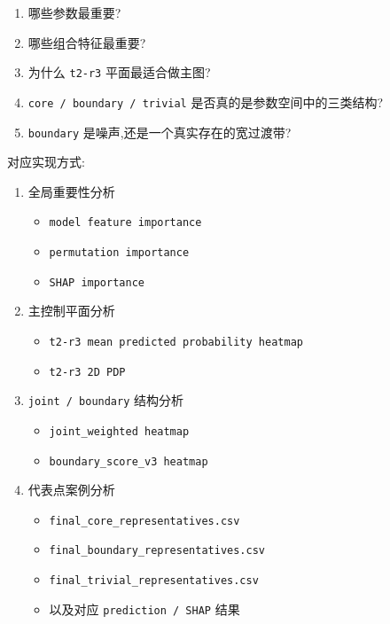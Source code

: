 \documentclass[lang=cn,scheme=chinese,color=blue,device=normal,toc=onecol,math=cm]{elegantbook}
\begin{document}
\begin{enumerate}
\item 哪些参数最重要?
\item 哪些组合特征最重要?
\item 为什么 \texttt{t2-r3} 平面最适合做主图?
\item \texttt{core /\allowbreak{} boundary /\allowbreak{} trivial} 是否真的是参数空间中的三类结构?
\item \texttt{boundary} 是噪声,还是一个真实存在的宽过渡带?
\end{enumerate}


对应实现方式:\par


\begin{enumerate}
\item 全局重要性分析 
\begin{itemize}
\item \texttt{model feature importance}
\item \texttt{permutation importance}
\item \texttt{SHAP importance}
\end{itemize}
\item 主控制平面分析 
\begin{itemize}
\item \texttt{t2-r3 mean predicted probability heatmap}
\item \texttt{t2-r3 2D PDP}
\end{itemize}
\item \texttt{joint /\allowbreak{} boundary} 结构分析 
\begin{itemize}
\item \texttt{joint\_\allowbreak{}weighted heatmap}
\item \texttt{boundary\_\allowbreak{}score\_\allowbreak{}v3 heatmap}
\end{itemize}
\item 代表点案例分析 
\begin{itemize}
\item \texttt{final\_\allowbreak{}core\_\allowbreak{}representatives.csv}
\item \texttt{final\_\allowbreak{}boundary\_\allowbreak{}representatives.csv}
\item \texttt{final\_\allowbreak{}trivial\_\allowbreak{}representatives.csv}
\item 以及对应 \texttt{prediction /\allowbreak{} SHAP} 结果
\end{itemize}
\end{enumerate}
\end{document}
